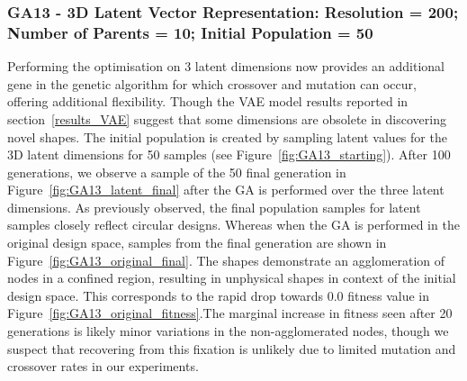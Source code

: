 \documentclass{article}
\begin{document}
\subsubsection*{GA13 - 3D Latent Vector Representation: Resolution = 200; Number of Parents = 10; Initial Population = 50}

Performing the optimisation on 3 latent dimensions now provides an additional gene in the genetic algorithm for which crossover and mutation can occur, offering additional flexibility. Though the VAE model results reported in section~\ref{results_VAE} suggest that some dimensions are obsolete in discovering novel shapes. The initial population is created by sampling latent values for the 3D latent dimensions for 50 samples (see Figure~\ref{fig:GA13_starting}). After 100 generations, we observe a sample of the 50 final generation in Figure~\ref{fig:GA13_latent_final} after the GA is performed over the three latent dimensions. As previously observed, the final population samples for latent samples closely reflect circular designs. Whereas when the GA is performed in the original design space, samples from the final generation are shown in Figure~\ref{fig:GA13_original_final}. The shapes demonstrate an agglomeration of nodes in a confined region, resulting in unphysical shapes in context of the initial design space. This corresponds to the rapid drop towards $0.0$ fitness value in Figure~\ref{fig:GA13_original_fitness}.The marginal increase in fitness seen after 20 generations is likely minor variations in the non-agglomerated nodes, though we suspect that recovering from this fixation is unlikely due to limited mutation and crossover rates in our experiments.
\end{document}

